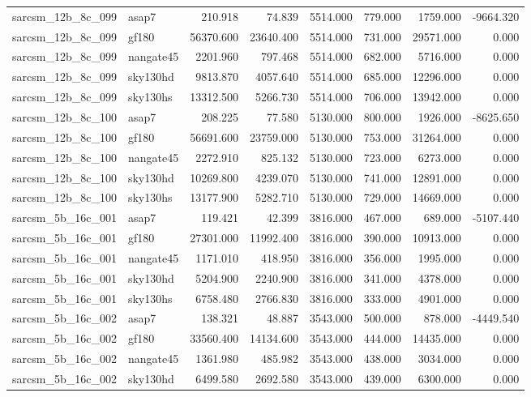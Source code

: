 \begin{tabular}{llrrrrrr}
sarcsm\_12b\_8c\_099 & asap7 & 210.918 & 74.839 & 5514.000 & 779.000 & 1759.000 & -9664.320 \\
sarcsm\_12b\_8c\_099 & gf180 & 56370.600 & 23640.400 & 5514.000 & 731.000 & 29571.000 & 0.000 \\
sarcsm\_12b\_8c\_099 & nangate45 & 2201.960 & 797.468 & 5514.000 & 682.000 & 5716.000 & 0.000 \\
sarcsm\_12b\_8c\_099 & sky130hd & 9813.870 & 4057.640 & 5514.000 & 685.000 & 12296.000 & 0.000 \\
sarcsm\_12b\_8c\_099 & sky130hs & 13312.500 & 5266.730 & 5514.000 & 706.000 & 13942.000 & 0.000 \\
sarcsm\_12b\_8c\_100 & asap7 & 208.225 & 77.580 & 5130.000 & 800.000 & 1926.000 & -8625.650 \\
sarcsm\_12b\_8c\_100 & gf180 & 56691.600 & 23759.000 & 5130.000 & 753.000 & 31264.000 & 0.000 \\
sarcsm\_12b\_8c\_100 & nangate45 & 2272.910 & 825.132 & 5130.000 & 723.000 & 6273.000 & 0.000 \\
sarcsm\_12b\_8c\_100 & sky130hd & 10269.800 & 4239.070 & 5130.000 & 741.000 & 12891.000 & 0.000 \\
sarcsm\_12b\_8c\_100 & sky130hs & 13177.900 & 5282.710 & 5130.000 & 729.000 & 14669.000 & 0.000 \\
sarcsm\_5b\_16c\_001 & asap7 & 119.421 & 42.399 & 3816.000 & 467.000 & 689.000 & -5107.440 \\
sarcsm\_5b\_16c\_001 & gf180 & 27301.000 & 11992.400 & 3816.000 & 390.000 & 10913.000 & 0.000 \\
sarcsm\_5b\_16c\_001 & nangate45 & 1171.010 & 418.950 & 3816.000 & 356.000 & 1995.000 & 0.000 \\
sarcsm\_5b\_16c\_001 & sky130hd & 5204.900 & 2240.900 & 3816.000 & 341.000 & 4378.000 & 0.000 \\
sarcsm\_5b\_16c\_001 & sky130hs & 6758.480 & 2766.830 & 3816.000 & 333.000 & 4901.000 & 0.000 \\
sarcsm\_5b\_16c\_002 & asap7 & 138.321 & 48.887 & 3543.000 & 500.000 & 878.000 & -4449.540 \\
sarcsm\_5b\_16c\_002 & gf180 & 33560.400 & 14134.600 & 3543.000 & 444.000 & 14435.000 & 0.000 \\
sarcsm\_5b\_16c\_002 & nangate45 & 1361.980 & 485.982 & 3543.000 & 438.000 & 3034.000 & 0.000 \\
sarcsm\_5b\_16c\_002 & sky130hd & 6499.580 & 2692.580 & 3543.000 & 439.000 & 6300.000 & 0.000 \\

\end{tabular}
